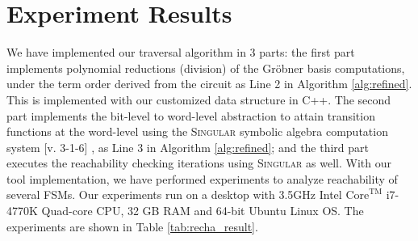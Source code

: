 \begin{Example}
\begin{figure}[bp]
\end{figure}

\end{Example}

\section{Experiment Results}
\label{sec:exp_reacha}
We have implemented our traversal algorithm in 3 parts:
the first part implements polynomial reductions (division) of the
Gr\"obner basis computations, under the term order derived from the
circuit as Line 2 in Algorithm \ref{alg:refined}. This is implemented 
with our customized data structure in
C++. The second part implements the bit-level to word-level
abstraction to attain transition functions at the word-level 
using the \textsc{Singular} symbolic
algebra computation system [v. 3-1-6] \cite{DGPS}, as Line 3 in 
Algorithm \ref{alg:refined}; and the third part
executes the reachability checking iterations using 
\textsc{Singular} as well. With our
tool implementation, we have performed experiments to analyze reachability
of several FSMs. Our experiments run on a desktop with
3.5GHz Intel $\text{Core}^\text{TM}$ i7-4770K Quad-core CPU, 32 GB RAM and
64-bit Ubuntu Linux OS. The experiments are shown in Table \ref{tab:recha_result}. 

